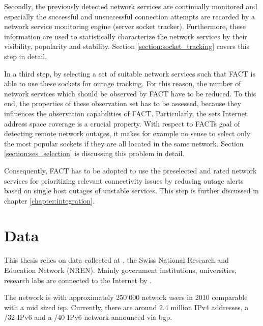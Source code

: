 Secondly, the previously detected network services are continually monitored and
especially the successful and unsuccessful connection attempts are recorded by
a network service monitoring engine (server socket tracker).
Furthermore, these information are used to statistically characterize the 
network services by their visibility, popularity and stability. Section 
\ref{section:socket_tracking} covers this step in detail.

In a third step, by selecting a set of suitable network services such that 
\gls{FACT} is able to use these sockets for outage tracking. For this reason, 
the number of network services which should be observed by \gls{FACT} have to be 
reduced. To this end, the properties of these observation set has to be 
assessed, because they influences the observation capabilities of \gls{FACT}. 
Particularly, the sets Internet address space coverage is a crucial 
property. With respect to FACTs goal of detecting remote network 
outages, it makes for example no sense to select only the most popular sockets 
if they are all located in the same network. Section \ref{section:ses_selection} 
is discussing this problem in detail. 

Consequently, \gls{FACT} has to be adopted to use the preselected and rated 
network services for prioritizing relevant connectivity issues by reducing 
outage alerts based on single host outages of unstable services. This step is 
further discussed in chapter \ref{chapter:integration}.

\section{Data
\label{section:data}}

This thesis relies on data collected at \citet{switch}, the Swiss National 
Research and Education Network (NREN). Mainly government institutions, 
universities, research labs are connected to the Internet by \citet{switch}\citep{Schatzmann:Mining}.

The \citet{switch} network is with approximately 250'000 network users in 2010 comparable with a mid sized \gls{isp}. Currently, there are around 2.4 million \gls{IPv4} addresses, a /32 IPv6 and a /40 \gls{IPv6} network announced via \gls{bgp}\citep{Schatzmann:Tracing}.

